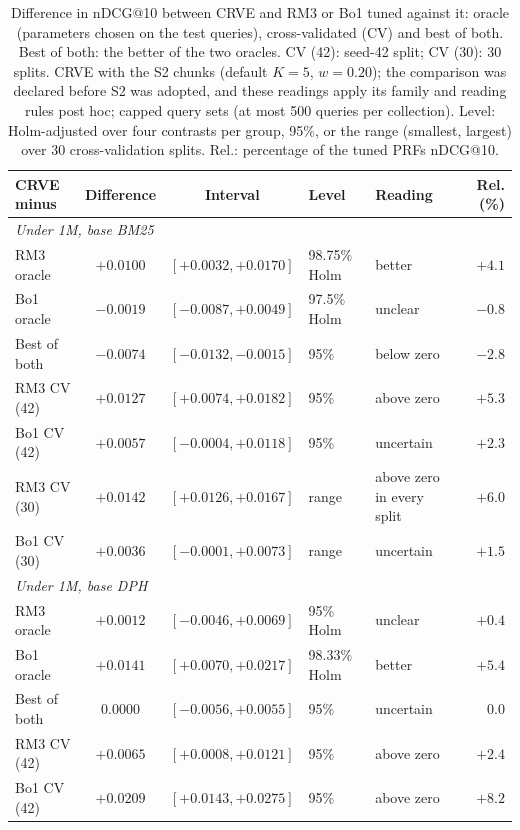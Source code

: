 \documentclass[10pt,a4paper]{article}
\newcommand{\method}{CRVE\xspace}
\begin{document}
\begin{table}[!htbp]
\caption{Difference in nDCG@10 between \method and RM3 or Bo1 tuned against it: oracle (parameters chosen on the test queries), cross-validated (CV) and best of both. Best of both: the better of the two oracles. CV (42): seed-42 split; CV (30): 30 splits. \method with the S2 chunks (default $K=5$, $w=0.20$); the comparison was declared before S2 was adopted, and these readings apply its family and reading rules post hoc; capped query sets (at most 500 queries per collection). Level: Holm-adjusted over four contrasts per group, 95\%, or the range (smallest, largest) over 30 cross-validation splits. Rel.: percentage of the tuned PRF\textquotesingle s nDCG@10.\label{tab:B-tuned-prf}}
\footnotesize
\setlength{\tabcolsep}{3pt}
\begin{tabularx}{\textwidth}{lccl>{\raggedright\arraybackslash}Xr}
\toprule
\method minus & Difference & Interval & Level & Reading & Rel. (\%) \\
\midrule
\multicolumn{6}{l}{\emph{Under 1M, base BM25}} \\
RM3 oracle & $+0.0100$ & $[+0.0032, +0.0170]$ & 98.75\% Holm & better & $+4.1$ \\
Bo1 oracle & $-0.0019$ & $[-0.0087, +0.0049]$ & 97.5\% Holm & unclear & $-0.8$ \\
Best of both & $-0.0074$ & $[-0.0132, -0.0015]$ & 95\% & below zero & $-2.8$ \\
RM3 CV (42) & $+0.0127$ & $[+0.0074, +0.0182]$ & 95\% & above zero & $+5.3$ \\
Bo1 CV (42) & $+0.0057$ & $[-0.0004, +0.0118]$ & 95\% & uncertain & $+2.3$ \\
RM3 CV (30) & $+0.0142$ & $[+0.0126, +0.0167]$ & range & above zero in every split & $+6.0$ \\
Bo1 CV (30) & $+0.0036$ & $[-0.0001, +0.0073]$ & range & uncertain & $+1.5$ \\
\midrule
\multicolumn{6}{l}{\emph{Under 1M, base DPH}} \\
RM3 oracle & $+0.0012$ & $[-0.0046, +0.0069]$ & 95\% Holm & unclear & $+0.4$ \\
Bo1 oracle & $+0.0141$ & $[+0.0070, +0.0217]$ & 98.33\% Holm & better & $+5.4$ \\
Best of both & $0.0000$ & $[-0.0056, +0.0055]$ & 95\% & uncertain & $0.0$ \\
RM3 CV (42) & $+0.0065$ & $[+0.0008, +0.0121]$ & 95\% & above zero & $+2.4$ \\
Bo1 CV (42) & $+0.0209$ & $[+0.0143, +0.0275]$ & 95\% & above zero & $+8.2$ \\

\end{tabularx}
\end{table}
\end{document}
